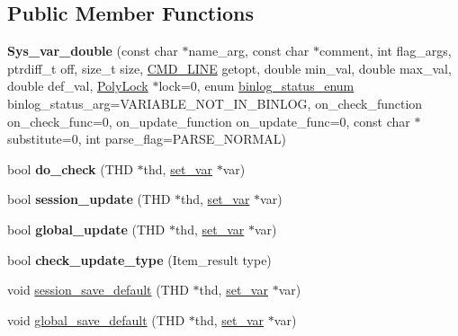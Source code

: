\subsection*{Public Member Functions}
\begin{DoxyCompactItemize}
\item 
\mbox{\label{classSys__var__double_af7ee6ac58cb8a6ef9687ef1b78c908e0}} 
{\bfseries Sys\+\_\+var\+\_\+double} (const char $\ast$name\+\_\+arg, const char $\ast$comment, int flag\+\_\+args, ptrdiff\+\_\+t off, size\+\_\+t size, \mbox{\hyperlink{structCMD__LINE}{C\+M\+D\+\_\+\+L\+I\+NE}} getopt, double min\+\_\+val, double max\+\_\+val, double def\+\_\+val, \mbox{\hyperlink{classPolyLock}{Poly\+Lock}} $\ast$lock=0, enum \mbox{\hyperlink{classsys__var_a664520ec82191888717c86085bfa83ce}{binlog\+\_\+status\+\_\+enum}} binlog\+\_\+status\+\_\+arg=V\+A\+R\+I\+A\+B\+L\+E\+\_\+\+N\+O\+T\+\_\+\+I\+N\+\_\+\+B\+I\+N\+L\+OG, on\+\_\+check\+\_\+function on\+\_\+check\+\_\+func=0, on\+\_\+update\+\_\+function on\+\_\+update\+\_\+func=0, const char $\ast$substitute=0, int parse\+\_\+flag=P\+A\+R\+S\+E\+\_\+\+N\+O\+R\+M\+AL)
\item 
\mbox{\label{classSys__var__double_af108ab9b8e9b516419cfbd45345f2c3a}} 
bool {\bfseries do\+\_\+check} (T\+HD $\ast$thd, \mbox{\hyperlink{classset__var}{set\+\_\+var}} $\ast$var)
\item 
\mbox{\label{classSys__var__double_a9a19ccabbd6f2e5b37b3a61d1fa1414f}} 
bool {\bfseries session\+\_\+update} (T\+HD $\ast$thd, \mbox{\hyperlink{classset__var}{set\+\_\+var}} $\ast$var)
\item 
\mbox{\label{classSys__var__double_aabac532b4dfb2b157dd3efde285dda20}} 
bool {\bfseries global\+\_\+update} (T\+HD $\ast$thd, \mbox{\hyperlink{classset__var}{set\+\_\+var}} $\ast$var)
\item 
\mbox{\label{classSys__var__double_aedf698201c2a9f7e64e1540171413d4d}} 
bool {\bfseries check\+\_\+update\+\_\+type} (Item\+\_\+result type)
\item 
void \mbox{\hyperlink{classSys__var__double_a11ba42d3f6f65a0bf3dcaf4e2d8d1d22}{session\+\_\+save\+\_\+default}} (T\+HD $\ast$thd, \mbox{\hyperlink{classset__var}{set\+\_\+var}} $\ast$var)
\item 
void \mbox{\hyperlink{classSys__var__double_a4c08f551e54b822ef9fccdc9b8c75517}{global\+\_\+save\+\_\+default}} (T\+HD $\ast$thd, \mbox{\hyperlink{classset__var}{set\+\_\+var}} $\ast$var)
\end{DoxyCompactItemize}
